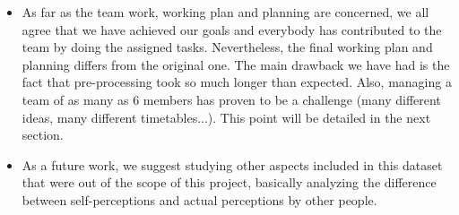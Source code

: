 \begin{itemize}
    \item As far as the team work, working plan and planning are concerned, we all agree that we have achieved our goals and everybody has contributed to the team by doing the assigned tasks. Nevertheless, the final working plan and planning differs from the original one. The main drawback we have had is the fact that pre-processing took so much longer than expected. Also, managing a team of as many as 6 members has proven to be a challenge (many different ideas, many different timetables...). This point will be detailed in the next section.
    \item As a future work, we suggest studying other aspects included in this dataset that were out of the scope of this project, basically analyzing the difference between self-perceptions and actual perceptions by other people.
\end{itemize}
